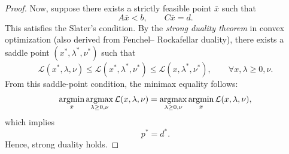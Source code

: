 \documentclass[../main]{subfiles}
\begin{document}
\begin{proof}
    Now, suppose there exists a strictly feasible point $\bar{x}$ such that
    \begin{equation}
        A \bar{x} < b, \qquad C \bar{x} = d.
    \end{equation}
    This satisfies the {Slater’s condition}.  
    By the \emph{strong duality theorem} in convex optimization (also derived from Fenchel– Rockafellar duality), there exists a saddle point $(x^*, \lambda^*, \nu^*)$ such that
    \begin{equation}
        \mathcal{L}(x^*, \lambda, \nu) \le \mathcal{L}(x^*, \lambda^*, \nu^*) \le \mathcal{L}(x, \lambda^*, \nu^*),
        \qquad \forall x, \lambda \ge 0, \nu.
    \end{equation}
    From this saddle-point condition, the minimax equality follows:
    \begin{equation}
        \mathop{\mathrm{argmin}}_{x} \mathop{\mathrm{argmax}}_{\lambda \ge 0, \nu} \mathcal{L}(x, \lambda, \nu)
        = \mathop{\mathrm{argmax}}_{\lambda \ge 0, \nu} \mathop{\mathrm{argmin}}_{x} \mathcal{L}(x, \lambda, \nu),
    \end{equation}
    which implies
    \begin{equation}
        p^* = d^*.
    \end{equation}
    Hence, strong duality holds.
\end{proof}
\end{document}
